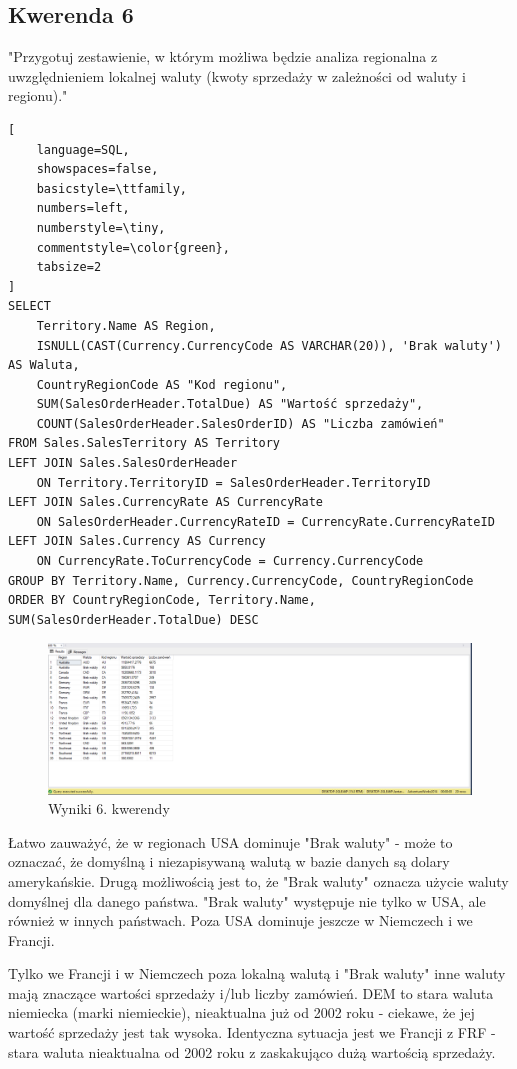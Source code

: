 \documentclass[a4paper,12pt]{article}
\begin{document}
\subsection{Kwerenda 6}

"Przygotuj zestawienie, w którym możliwa będzie analiza regionalna z uwzględnieniem lokalnej waluty (kwoty sprzedaży w zależności od waluty i regionu)."

{\small
\begin{lstlisting}[
	language=SQL,
	showspaces=false,
	basicstyle=\ttfamily,
	numbers=left,
	numberstyle=\tiny,
	commentstyle=\color{green},
	tabsize=2
]
SELECT 
	Territory.Name AS Region,
	ISNULL(CAST(Currency.CurrencyCode AS VARCHAR(20)), 'Brak waluty') AS Waluta,
	CountryRegionCode AS "Kod regionu",
	SUM(SalesOrderHeader.TotalDue) AS "Wartość sprzedaży",
	COUNT(SalesOrderHeader.SalesOrderID) AS "Liczba zamówień"
FROM Sales.SalesTerritory AS Territory
LEFT JOIN Sales.SalesOrderHeader 
	ON Territory.TerritoryID = SalesOrderHeader.TerritoryID
LEFT JOIN Sales.CurrencyRate AS CurrencyRate
	ON SalesOrderHeader.CurrencyRateID = CurrencyRate.CurrencyRateID
LEFT JOIN Sales.Currency AS Currency
	ON CurrencyRate.ToCurrencyCode = Currency.CurrencyCode
GROUP BY Territory.Name, Currency.CurrencyCode, CountryRegionCode
ORDER BY CountryRegionCode, Territory.Name, SUM(SalesOrderHeader.TotalDue) DESC
\end{lstlisting}}

\begin{figure}[H]
	\centering
	\includegraphics[width=1.0\textwidth]{images/6.png}
	\caption{Wyniki 6. kwerendy}
\end{figure}

Łatwo zauważyć, że w regionach USA dominuje "Brak waluty" - może to oznaczać, że domyślną i niezapisywaną walutą w bazie danych są dolary amerykańskie. Drugą możliwością jest to, że "Brak waluty" oznacza użycie waluty domyślnej dla danego państwa. "Brak waluty" występuje nie tylko w USA, ale również w innych państwach. Poza USA dominuje jeszcze w Niemczech i we Francji.

Tylko we Francji i w Niemczech poza lokalną walutą i "Brak waluty" inne waluty mają znaczące wartości sprzedaży i/lub liczby zamówień. DEM to stara waluta niemiecka (marki niemieckie), nieaktualna już od 2002 roku - ciekawe, że jej wartość sprzedaży jest tak wysoka. Identyczna sytuacja jest we Francji z FRF - stara waluta nieaktualna od 2002 roku z zaskakująco dużą wartością sprzedaży.
\end{document}

